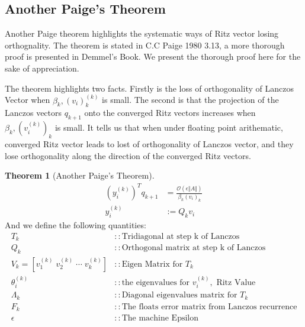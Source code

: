 \documentclass[]{article}
\theoremstyle{definition}
\newtheorem{theorem}{Theorem}            %
\begin{document}
    \subsection{Another Paige's Theorem}
        Another Paige theorem highlights the systematic ways of Ritz vector losing orthognality. The theorem is stated in C.C Paige 1980 3.13\cite{paper:paige1980}, a more thorough proof is presented in Demmel's Book\cite{book:demmel997}. We present the thorough proof here for the sake of appreciation. 
        \par
        The theorem highlights two facts. Firstly is the loss of orthogonality of Lanczos Vector when $\beta_k, (v_i)_k^{(k)}$ is small. The second is that the projection of the Lanczos vectors $q_{k + 1}$ onto the converged Ritz vectors increases when $\beta_k, (v_i^{(k)})_k$ is small. It tells us that when under floating point arithematic, converged Ritz vector leads to lost of orthogonality of Lanczos vector, and they lose orthogonality along the direction of the converged Ritz vectors. 
        \begin{theorem}[Another Paige's Theorem]
            \begin{align}
                (y_i^{(k)})^Tq_{k + 1} &= \frac{\mathcal O(\epsilon \Vert A\Vert)}{\beta_k (v_i)_k}    
                \\
                y_i^{(k)} &:= Q_kv_i
            \end{align}
            And we define the following quantities: 
            \begin{align}
                T_k &:: \text{Tridiagonal at step k of Lanczos}
                \\
                Q_k &:: \text{Orthogonal matrix at step k of Lanczos}
                \\
                V_k = [v_1^{(k)}\;  v_2^{(k)}\; \cdots \; v_k^{(k)}] &:: \text{Eigen Matrix for } T_k
                \\
                \theta_i^{(k)} &:: \text{the eigenvalues for }v_i^{(k)}, \text{ Ritz Value}
                \\
                \Lambda_k &:: \text{Diagonal eigenvalues matrix for }T_k
                \\
                F_k &::\text{The floats error matrix from Lanczos recurrence}
                \\
                \epsilon &:: \text{The machine Epsilon}
            \end{align}
        
        \end{theorem}
\end{document}
